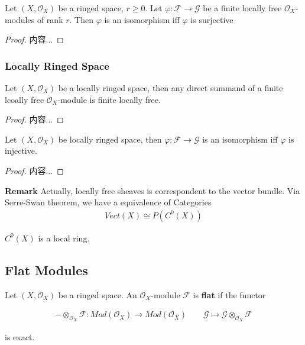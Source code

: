 \documentclass[Total.tex]{subfiles}
\begin{document}
				\begin{lemma}
					Let $(X,\mathcal{O}_X)$ be a ringed space, $r\geq 0$. Let $\varphi:\mathcal{F}\rightarrow \mathcal{G}$ be a finite locally free $\mathcal{O}_X$-modules of rank $r$. Then $\varphi$ is an isomorphism iff $\varphi$ is surjective
				\end{lemma}
				\begin{proof}
					内容...
				\end{proof}
				
				\subsubsection{Locally Ringed Space}
				\begin{lemma}
					Let $(X,\mathcal{O}_{X})$ be a locally ringed space, then any direct summand of a finite lcoally free $\mathcal{O}_X$-module is finite locally free.
				\end{lemma}
				\begin{proof}
					内容...
				\end{proof}
				
				\begin{lemma}
					Let $(X,\mathcal{O}_X)$ be locally ringed space, then $\varphi:\mathcal{F}\rightarrow \mathcal{G}$ is an isomorphism iff $\varphi$ is injective.
				\end{lemma}
				\begin{proof}
					内容...
				\end{proof}
				
				\textbf{Remark} Actually, locally free sheaves is correspondent to the vector bundle. Via Serre-Swan theorem, we have a equivalence of Categories
				\begin{gather*}
					Vect(X)\cong P(C^0(X))
				\end{gather*}
				
				$C^0(X)$ is a local ring. 
				
			\subsection{Flat Modules}
			
				\begin{Def}
					Let $(X,\mathcal{O}_X)$ be a ringed space. An $\mathcal{O}_X$-module $\mathcal{F}$ is \textbf{flat} if the functor
					
					\begin{gather*}
						-\otimes_{\mathcal{O}_X} \mathcal{F}:Mod(\mathcal{O}_X)\rightarrow Mod(\mathcal{O}_X)\qquad \mathcal{G}\mapsto \mathcal{G}\otimes_{\mathcal{O}_X} \mathcal{F}
					\end{gather*}
					
					is exact.
				\end{Def}
				
\end{document}

